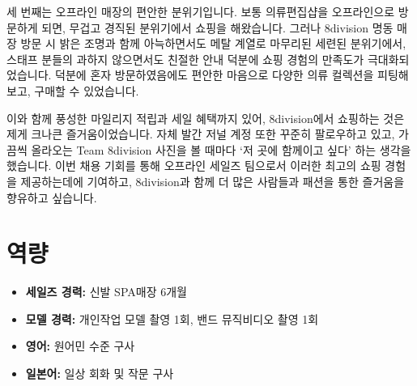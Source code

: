 세 번째는 오프라인 매장의 편안한 분위기입니다. 보통 의류편집샵을 오프라인으로 방문하게 되면, 무겁고 경직된 분위기에서 쇼핑을 해왔습니다. 그러나 8division 명동 매장 방문 시 밝은 조명과 함께 아늑하면서도 메탈 계열로 마무리된 세련된 분위기에서, 스태프 분들의 과하지 않으면서도 친절한 안내 덕분에 쇼핑 경험의 만족도가 극대화되었습니다. 덕분에 혼자 방문하였음에도 편안한 마음으로 다양한 의류 컬렉션을 피팅해보고, 구매할 수 있었습니다.

이와 함께 풍성한 마일리지 적립과 세일 혜택까지 있어, 8division에서 쇼핑하는 것은 제게 크나큰 즐거움이었습니다. 자체 발간 저널 계정 또한 꾸준히 팔로우하고 있고, 가끔씩 올라오는 Team 8division 사진을 볼 때마다 `저 곳에 함께이고 싶다' 하는 생각을 했습니다. 이번 채용 기회를 통해 오프라인 세일즈 팀으로서 이러한 최고의 쇼핑 경험을 제공하는데에 기여하고, 8division과 함께 더 많은 사람들과 패션을 통한 즐거움을 향유하고 싶습니다.

\section*{역량}
\begin{itemize}
    \item \textbf{세일즈 경력: }신발 SPA매장 6개월
    \item \textbf{모델 경력: }개인작업 모델 촬영 1회, 밴드 뮤직비디오 촬영 1회
    \item \textbf{영어: }원어민 수준 구사
    \item \textbf{일본어: }일상 회화 및 작문 구사  
\end{itemize}

